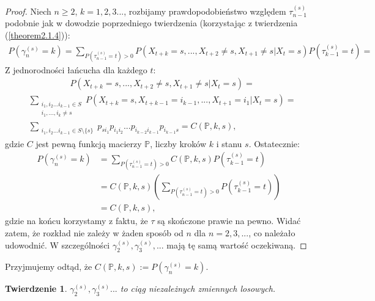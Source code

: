 \documentclass[a4paper]{article}
\theoremstyle{defn}
\theoremstyle{theorem}
\newtheorem{theorem}[defn]{Twierdzenie}
\theoremstyle{lemma}
\theoremstyle{cor}
\theoremstyle{fact}
\begin{document}
\begin{proof}
Niech $n\geq 2$, $k = 1,2,3...$, rozbijamy prawdopodobieństwo względem $\tau_{n-1}^{(s)}$ podobnie jak w dowodzie poprzedniego twierdzenia (korzystając z twierdzenia (\ref{theorem2.1.4})):\\
\begin{align*}
    P(\gamma_n^{(s)} = k) = \sum\limits_{P(\tau_{n-1}^{(s)} = t) > 0} P(X_{t+k} = s, ..., X_{t+2} \neq s, X_{t+1} \neq s| X_t = s)P(\tau_{k-1}^{(s)} = t) =
\end{align*}
Z jednorodności łańcucha dla każdego $t$:
\begin{align*}
    &P(X_{t+k} = s, ..., X_{t+2} \neq s, X_{t+1} \neq s| X_t = s) =
\end{align*}
\begin{align*}
    &\sum\limits_{\substack{i_1, i_2 ... i_{k-1} \in S\\ i_1,...,i_k \neq s}} P(X_{t+k} = s, X_{t+k-1} = i_{k-1}, ..., X_{t+1} = i_1 | X_t = s)=\\
    &\sum\limits_{\substack{i_1, i_2 ... i_{k-1} \in S\setminus \{s\}}} p_{si_1}p_{i_1 i_2}...p_{i_{k-2}i_{k-1}} p_{i_{k-1} s} = C(\mathbb{P}, k, s),
\end{align*}
gdzie $C$ jest pewną funkcją macierzy $\mathbb{P}$, liczby kroków $k$ i stanu $s$. Ostatecznie:
\begin{align*}
    P(\gamma_n^{(s)} = k) &= \sum\limits_{P(\tau_{n-1}^{(s)} = t) > 0} C(\mathbb{P}, k, s)P(\tau_{k-1}^{(s)} = t) \\
    &= C(\mathbb{P}, k, s) \left(\sum\limits_{P(\tau_{n-1}^{(s)} = t) > 0}P(\tau_{k-1}^{(s)} = t)\right) \\
    &= C(\mathbb{P}, k, s),
\end{align*}
gdzie na końcu korzystamy z faktu, że $\tau$ są skończone prawie na pewno. Widać zatem, że rozkład nie zależy w żaden sposób od $n$ dla $n = 2, 3,...$, co należało udowodnić. W szczególności $\gamma_2^{(s)}, \gamma_3^{(s)}, ...$ mają tę samą wartość oczekiwaną.
\end{proof}
Przyjmujemy odtąd, że $C(\mathbb{P}, k, s) := P(\gamma_n^{(s)} = k)$.
\begin{theorem}\label{theorem2.5.9}
$\gamma_2^{(s)}, \gamma_3^{(s)}...$ to ciąg niezależnych zmiennych losowych.
\end{theorem}
\end{document}
